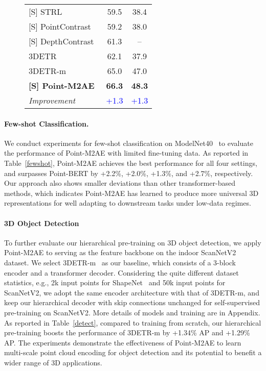 \documentclass{article}
\begin{document}
\begin{figure*}[t!]
\begin{minipage}[h!]{0.43\linewidth}
\begin{adjustbox}{width=0.95\linewidth}
\begin{tabular}{lcc}
	    {[S]} STRL~\cite{strl} &59.5 &38.4 \\
{[S]} PointContrast~\cite{pointcontrast}  &59.2 &38.0 \\
	    {[S]} DepthContrast~\cite{depthcontrast}  &61.3 &– \\
\cmidrule(lr){1-3}
	   3DETR~\cite{3detr} &62.1 &37.9 \\
	   3DETR-m~\cite{3detr} &65.0 &47.0 \\
\rowcolor{gray!8} \textbf{[S] Point-M2AE} &\textbf{66.3}  &\textbf{48.3}\vspace{0.1cm} \\
	    \textit{Improvement} &\textcolor{blue}{+1.3} &\textcolor{blue}{+1.3} \\
	  \bottomrule
	\end{tabular}
\end{adjustbox}
\end{minipage}
\vspace*{-0.1cm}
\end{figure*}


\paragraph{Few-shot Classification.}
We conduct experiments for few-shot classification on ModelNet40~\cite{modelnet40} to evaluate the performance of Point-M2AE with limited fine-tuning data. 
As reported in Table~\ref{fewshot}, Point-M2AE achieves the best performance for all four settings, and surpasses Point-BERT by +2.2\%, +2.0\%, +1.3\%, and +2.7\%, respectively. Our approach also shows smaller deviations than other transformer-based methods, which indicates Point-M2AE has learned to produce more universal 3D representations for well adapting to downstream tasks under low-data regimes.


\paragraph{3D Object Detection}
To further evaluate our hierarchical pre-training on 3D object detection, we apply Point-M2AE to serving as the feature backbone on the indoor ScanNetV2~\cite{ScanNetV2} dataset. We select 3DETR-m~\cite{3detr} as our baseline, which consists of a 3-block encoder and a transformer decoder. Considering the quite different dataset statistics, e.g., 2k input points for ShapeNet~\cite{chang2015shapenet} and 50k input points for ScanNetV2, we adopt the same encoder architecture with that of 3DETR-m, and keep our hierarchical decoder with skip connections unchanged for self-supervised pre-training on ScanNetV2.
More details of models and training are in Appendix. As reported in Table~\ref{detect}, compared to training from scratch, our hierarchical pre-training boosts the performance of 3DETR-m by +1.34\% AP and +1.29\% AP. The experiments demonstrate the effectiveness of Point-M2AE to learn multi-scale point cloud encoding for object detection and its potential to benefit a wider range of 3D applications.
\end{document}
